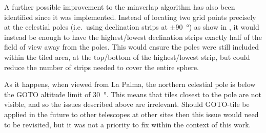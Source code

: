 \begin{colsection}
\begin{colsection}
A further possible improvement to the minverlap algorithm has also been identified since it was implemented. Instead of locating two grid points precisely at the celestial poles (i.e.\ using declination strips at $\pm$\SI{90}{\degree}) as show in , it would instead be enough to have the highest/lowest declination strips exactly half of the field of view away from the poles. This would ensure the poles were still included within the tiled area, at the top/bottom of the highest/lowest strip, but could reduce the number of strips needed to cover the entire sphere.

As it happens, when viewed from La Palma, the northern celestial pole is below the GOTO altitude limit of \SI{30}{\degree}. This means that tiles closest to the pole are not visible, and so the issues described above are irrelevant. Should GOTO-tile be applied in the future to other telescopes at other sites then this issue would need to be revisited, but it was not a priority to fix within the context of this work.

\end{colsection}


\end{colsection}


\newpage
